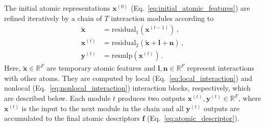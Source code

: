 \documentclass[%
superscriptaddress,
reprint,
nofootinbib,
amsmath,amssymb,amsfonts,
floatfix,
altaffilletter,
showkeys,
]{revtex4-2}
\begin{document}
The initial atomic representations $\mathbf{x}^{(0)}$ (Eq.~\ref{eq:initial_atomic_features}) are refined iteratively by a chain of $T$ interaction modules according to
\begin{equation}
\begin{aligned}
\tilde{\mathbf{x}} &= \mathrm{residual}_1(\mathbf{x}^{(t-1)})\,,\\
\mathbf{x}^{(t)} &= \mathrm{residual}_2(\tilde{\mathbf{x}} + \mathbf{l} + \mathbf{n})\,,\\
\mathbf{y}^{(t)} &= \mathrm{resmlp}(\mathbf{x}^{(t)})\,.
\end{aligned}
\label{eq:interaction_module}
\end{equation}
Here, $\tilde{\mathbf{x}}\in\mathbb{R}^F$ are temporary atomic features and $\mathbf{l},\mathbf{n}\in \mathbb{R}^F$ represent interactions with other atoms. They are computed by local (Eq.~\ref{eq:local_interaction}) and nonlocal (Eq.~\ref{eq:nonlocal_interaction}) interaction blocks, respectively, which are described below.
Each module $t$ produces two outputs $\mathbf{x}^{(t)},\mathbf{y}^{(t)}\in \mathbb{R}^F$, where $\mathbf{x}^{(t)}$ is the input to the next module in the chain and all $\mathbf{y}^{(t)}$ outputs are accumulated to the final atomic descriptors $\mathbf{f}$ (Eq.~\ref{eq:atomic_descriptor}).
\end{document}
